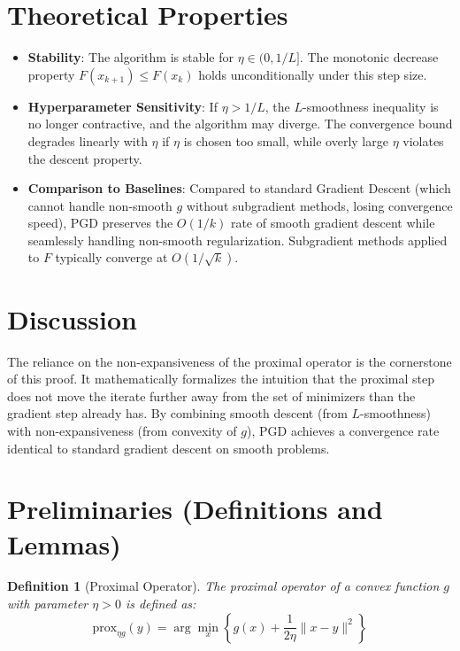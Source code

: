 \documentclass{article}
\newtheorem{definition}[theorem]{Definition}
\begin{document}
\section*{Theoretical Properties}
\begin{itemize}
\item \textbf{Stability}: The algorithm is stable for $\eta \in (0, 1/L]$. The monotonic decrease property $F(x_{k+1}) \leq F(x_k)$ holds unconditionally under this step size.
\item \textbf{Hyperparameter Sensitivity}: If $\eta > 1/L$, the $L$-smoothness inequality is no longer contractive, and the algorithm may diverge. The convergence bound degrades linearly with $\eta$ if $\eta$ is chosen too small, while overly large $\eta$ violates the descent property.
\item \textbf{Comparison to Baselines}: Compared to standard Gradient Descent (which cannot handle non-smooth $g$ without subgradient methods, losing convergence speed), PGD preserves the $O(1/k)$ rate of smooth gradient descent while seamlessly handling non-smooth regularization. Subgradient methods applied to $F$ typically converge at $O(1/\sqrt{k})$.
\end{itemize}

\section*{Discussion}
The reliance on the non-expansiveness of the proximal operator is the cornerstone of this proof. It mathematically formalizes the intuition that the proximal step does not move the iterate further away from the set of minimizers than the gradient step already has. By combining smooth descent (from $L$-smoothness) with non-expansiveness (from convexity of $g$), PGD achieves a convergence rate identical to standard gradient descent on smooth problems.

\section*{Preliminaries (Definitions and Lemmas)}
\begin{definition}[Proximal Operator]
The proximal operator of a convex function $g$ with parameter $\eta > 0$ is defined as:
\begin{equation}
\text{prox}_{\eta g}(y) = \arg\min_{x} \left\{ g(x) + \frac{1}{2\eta} \|x - y\|^2 \right\}
\end{equation}
\end{definition}
\end{document}
